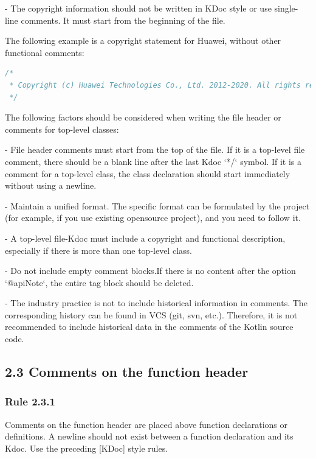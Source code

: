 - The copyright information should not be written in KDoc style or use single-line comments. It must start from the beginning of the file.

The following example is a copyright statement for Huawei, without other functional comments:



\begin{lstlisting}[language=Kotlin]
/*
 * Copyright (c) Huawei Technologies Co., Ltd. 2012-2020. All rights reserved.
 */
\end{lstlisting}


The following factors should be considered when writing the file header or comments for top-level classes:

- File header comments must start from the top of the file. If it is a top-level file comment, there should be a blank line after the last Kdoc `*/` symbol. If it is a comment for a top-level class, the class declaration should start immediately without using a newline.

- Maintain a unified format. The specific format can be formulated by the project (for example, if you use existing opensource project), and you need to follow it.

- A top-level file-Kdoc must include a copyright and functional description, especially if there is more than one top-level class.

- Do not include empty comment blocks.If there is no content after the option `@apiNote`, the entire tag block should be deleted.

- The industry practice is not to include historical information in comments. The corresponding history can be found in VCS (git, svn, etc.). Therefore, it is not recommended to include historical data in the comments of the Kotlin source code.





\subsection*{\textbf{2.3 Comments on the function header}}

\subsubsection*{\textbf{Rule 2.3.1}}
\leavevmode\newline

Comments on the function header are placed above function declarations or definitions. A newline should not exist between a function declaration and its Kdoc. Use the preceding [KDoc] style rules.



